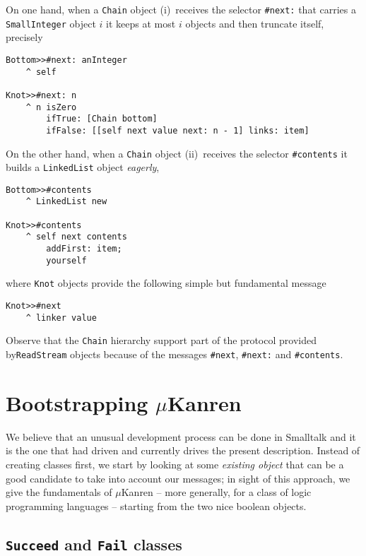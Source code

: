 \documentclass[a4paper,12pt]{article}
\begin{document}
On one hand, when a \Verb|Chain| object (i)~receives the selector
\Verb|#next:| that carries a \Verb|SmallInteger| object $i$ it keeps at most
$i$ objects and then truncate itself, precisely  
\begin{verbatim}
Bottom>>#next: anInteger 
    ^ self

Knot>>#next: n 
    ^ n isZero
        ifTrue: [Chain bottom]
        ifFalse: [[self next value next: n - 1] links: item]
\end{verbatim}
On the other hand, when a \Verb|Chain| object (ii)~receives the selector
\Verb|#contents| it builds a \Verb|LinkedList| object \textit{eagerly},
\begin{verbatim}
Bottom>>#contents
    ^ LinkedList new

Knot>>#contents
    ^ self next contents 
        addFirst: item;
        yourself
\end{verbatim}
where \Verb|Knot| objects provide the following simple but fundamental message
\begin{verbatim}
Knot>>#next
    ^ linker value
\end{verbatim}
Observe that the \Verb|Chain| hierarchy support part of the protocol provided
by\Verb|ReadStream| objects because of the messages \Verb|#next|, \Verb|#next:|
and \Verb|#contents|.


\section{Bootstrapping $\mu$Kanren}

We believe that an unusual development process can be done in Smalltalk and it
is the one that had driven and currently drives the present description.
Instead of creating classes first, we start by looking at some \textit{existing
object} that can be a good candidate to take into account our messages; in
sight of this approach, we give the fundamentals of $\mu$Kanren -- more
generally, for a class of logic programming languages -- starting from the two
nice boolean objects. 
    
\subsection{\texttt{Succeed} and \texttt{Fail} classes}    
\end{document}
